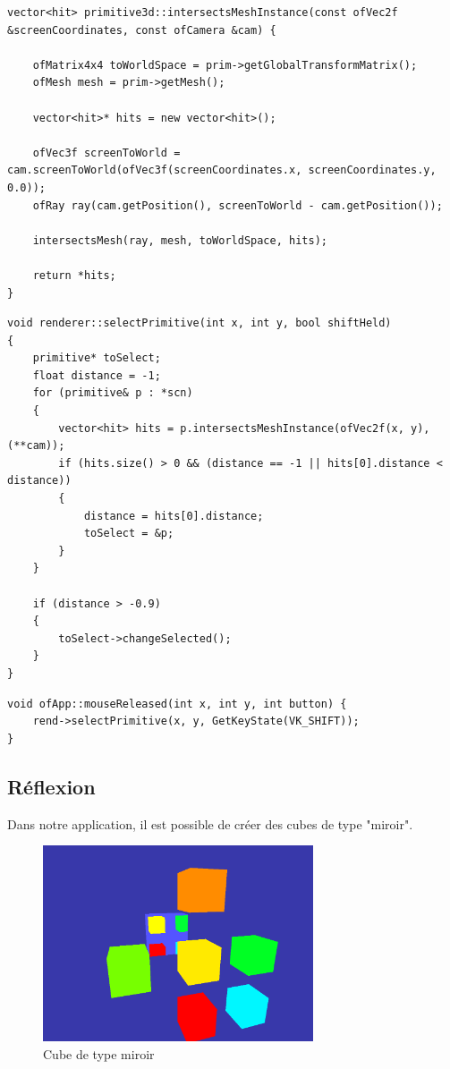 \begin{lstlisting}
vector<hit> primitive3d::intersectsMeshInstance(const ofVec2f &screenCoordinates, const ofCamera &cam) {

	ofMatrix4x4 toWorldSpace = prim->getGlobalTransformMatrix();
	ofMesh mesh = prim->getMesh();
	
	vector<hit>* hits = new vector<hit>();
	
	ofVec3f screenToWorld = cam.screenToWorld(ofVec3f(screenCoordinates.x, screenCoordinates.y, 0.0));
	ofRay ray(cam.getPosition(), screenToWorld - cam.getPosition());
	
	intersectsMesh(ray, mesh, toWorldSpace, hits);
	
	return *hits;
}
\end{lstlisting}

\begin{lstlisting}
void renderer::selectPrimitive(int x, int y, bool shiftHeld)
{
	primitive* toSelect;
	float distance = -1;
	for (primitive& p : *scn)
	{
		vector<hit> hits = p.intersectsMeshInstance(ofVec2f(x, y), (**cam));
		if (hits.size() > 0 && (distance == -1 || hits[0].distance < distance))
		{
			distance = hits[0].distance;
			toSelect = &p;
		}
	}
	
	if (distance > -0.9)
	{
		toSelect->changeSelected();
	}
}
\end{lstlisting}

\begin{lstlisting}
void ofApp::mouseReleased(int x, int y, int button) {
	rend->selectPrimitive(x, y, GetKeyState(VK_SHIFT));
}
\end{lstlisting}

\newpage

\subsection{Réflexion}
Dans notre application, il est possible de créer des cubes de type "miroir".

\begin{figure}[h]
	\centering
	\includegraphics[width=8cm]{fig/CubeReflection1.png}
	\caption{Cube de type miroir}
	\label{fig:propriete}
\end{figure}


